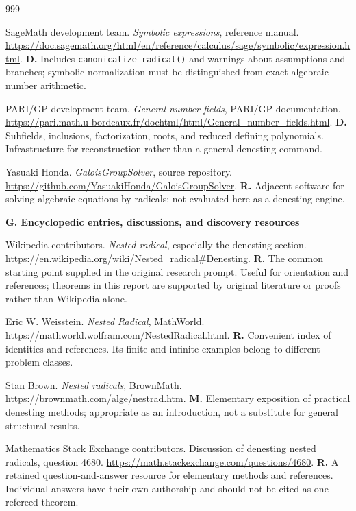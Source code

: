 \documentclass[11pt,a4paper]{article}
\let\sourceurl\url
\theoremstyle{definition}
\theoremstyle{remark}
\numberwithin{equation}{section}
\begin{document}
\begin{thebibliography}{999}
{{
SageMath development team.
\emph{Symbolic expressions}, reference manual.
\sourceurl{https://doc.sagemath.org/html/en/reference/calculus/sage/symbolic/expression.html}.
\textbf{D.} Includes \texttt{canonicalize\_radical()} and warnings about assumptions and branches; symbolic normalization must be distinguished from exact algebraic-number arithmetic.

PARI/GP development team.
\emph{General number fields}, PARI/GP documentation.
\sourceurl{https://pari.math.u-bordeaux.fr/dochtml/html/General_number_fields.html}.
\textbf{D.} Subfields, inclusions, factorization, roots, and reduced defining polynomials. Infrastructure for reconstruction rather than a general denesting command.

Yasuaki Honda.
\emph{GaloisGroupSolver}, source repository.
\sourceurl{https://github.com/YasuakiHonda/GaloisGroupSolver}.
\textbf{R.} Adjacent software for solving algebraic equations by radicals; not evaluated here as a denesting engine.

\item[]\textbf{G. Encyclopedic entries, discussions, and discovery resources}

Wikipedia contributors.
\emph{Nested radical}, especially the denesting section.
\sourceurl{https://en.wikipedia.org/wiki/Nested_radical#Denesting}.
\textbf{R.} The common starting point supplied in the original research prompt. Useful for orientation and references; theorems in this report are supported by original literature or proofs rather than Wikipedia alone.

Eric W. Weisstein.
\emph{Nested Radical}, MathWorld.
\sourceurl{https://mathworld.wolfram.com/NestedRadical.html}.
\textbf{R.} Convenient index of identities and references. Its finite and infinite examples belong to different problem classes.

Stan Brown.
\emph{Nested radicals}, BrownMath.
\sourceurl{https://brownmath.com/alge/nestrad.htm}.
\textbf{M.} Elementary exposition of practical denesting methods; appropriate as an introduction, not a substitute for general structural results.

Mathematics Stack Exchange contributors.
Discussion of denesting nested radicals, question 4680.
\sourceurl{https://math.stackexchange.com/questions/4680}.
\textbf{R.} A retained question-and-answer resource for elementary methods and references. Individual answers have their own authorship and should not be cited as one refereed theorem.

}}
\end{thebibliography}
\end{document}
